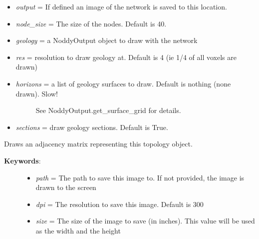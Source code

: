 \documentclass[a4paper,10pt,english]{sphinxmanual}
\begin{document}
\begin{fulllineitems}
\begin{fulllineitems}
\begin{description}
\begin{itemize}
\begin{description}
\end{description}

\item {} 
\emph{output} = If defined an image of the network is saved to this location.

\item {} 
\emph{node\_size} = The size of the nodes. Default is 40.

\item {} 
\emph{geology} = a NoddyOutput object to draw with the network

\item {} 
\emph{res} = resolution to draw geology at. Default is 4 (ie 1/4 of all voxels are drawn)

\item {} \begin{description}
\item[{\emph{horizons} = a list of geology surfaces to draw. Default is nothing (none drawn). Slow!}] \leavevmode
See NoddyOutput.get\_surface\_grid for details.

\end{description}

\item {} 
\emph{sections} = draw geology sections. Default is True.

\end{itemize}

\end{description}

\end{fulllineitems}


\begin{fulllineitems}
\label{pynoddy:pynoddy.output.NoddyTopology.draw_adjacency_matrix}
Draws an adjacency matrix representing this topology object.
\begin{description}
\item[{\textbf{Keywords}:}] \leavevmode\begin{itemize}
\item {} 
\emph{path} = The path to save this image to. If not provided, the image is drawn to the screen

\item {} 
\emph{dpi} = The resolution to save this image. Default is 300

\item {} 
\emph{size} = The size of the image to save (in inches). This value will be used as the width and the height


\end{itemize}
\end{description}
\end{fulllineitems}
\end{fulllineitems}
\end{document}
